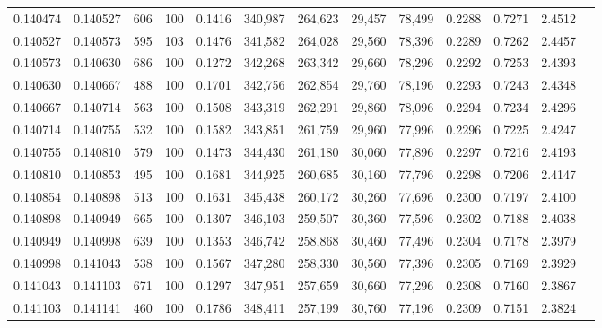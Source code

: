 \begin{tabular}{rrrrrrrrrrrrr}
0.140474 & 0.140527 &   606 & 100 &                                     0.1416 & 340,987 & 264,623 &  29,457 &  78,499 & 0.2288 & 0.7271 & 2.4512 \\
0.140527 & 0.140573 &   595 & 103 &                                     0.1476 & 341,582 & 264,028 &  29,560 &  78,396 & 0.2289 & 0.7262 & 2.4457 \\
0.140573 & 0.140630 &   686 & 100 &                                     0.1272 & 342,268 & 263,342 &  29,660 &  78,296 & 0.2292 & 0.7253 & 2.4393 \\
0.140630 & 0.140667 &   488 & 100 &                                     0.1701 & 342,756 & 262,854 &  29,760 &  78,196 & 0.2293 & 0.7243 & 2.4348 \\
0.140667 & 0.140714 &   563 & 100 &                                     0.1508 & 343,319 & 262,291 &  29,860 &  78,096 & 0.2294 & 0.7234 & 2.4296 \\
0.140714 & 0.140755 &   532 & 100 &                                     0.1582 & 343,851 & 261,759 &  29,960 &  77,996 & 0.2296 & 0.7225 & 2.4247 \\
0.140755 & 0.140810 &   579 & 100 &                                     0.1473 & 344,430 & 261,180 &  30,060 &  77,896 & 0.2297 & 0.7216 & 2.4193 \\
0.140810 & 0.140853 &   495 & 100 &                                     0.1681 & 344,925 & 260,685 &  30,160 &  77,796 & 0.2298 & 0.7206 & 2.4147 \\
0.140854 & 0.140898 &   513 & 100 &                                     0.1631 & 345,438 & 260,172 &  30,260 &  77,696 & 0.2300 & 0.7197 & 2.4100 \\
0.140898 & 0.140949 &   665 & 100 &                                     0.1307 & 346,103 & 259,507 &  30,360 &  77,596 & 0.2302 & 0.7188 & 2.4038 \\
0.140949 & 0.140998 &   639 & 100 &                                     0.1353 & 346,742 & 258,868 &  30,460 &  77,496 & 0.2304 & 0.7178 & 2.3979 \\
0.140998 & 0.141043 &   538 & 100 &                                     0.1567 & 347,280 & 258,330 &  30,560 &  77,396 & 0.2305 & 0.7169 & 2.3929 \\
0.141043 & 0.141103 &   671 & 100 &                                     0.1297 & 347,951 & 257,659 &  30,660 &  77,296 & 0.2308 & 0.7160 & 2.3867 \\
0.141103 & 0.141141 &   460 & 100 &                                     0.1786 & 348,411 & 257,199 &  30,760 &  77,196 & 0.2309 & 0.7151 & 2.3824 \\

\end{tabular}
